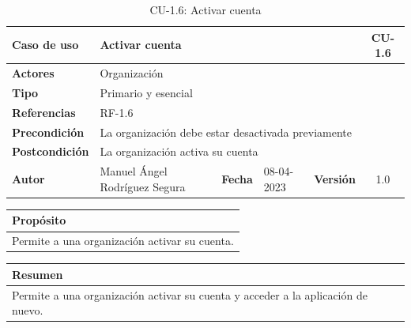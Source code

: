 \begin{table}[H]
    \begin{center}
        \begin{adjustbox}{width=\textwidth}
            \begin{tabular}{ | l | l | l | l | c | c | }
                \hline
                \textbf{Caso de uso} & \multicolumn{4}{l|}{Activar cuenta} & \cellcolor{gray!50} \textbf{CU-1.6}\\
                \hline
                \textbf{Actores} & \multicolumn{5}{p{0.5\linewidth}|}{Organización} \\
                \hline
                \textbf{Tipo} & \multicolumn{5}{l|}{Primario y esencial} \\
                \hline
                \textbf{Referencias} & \multicolumn{3}{l|}{RF-1.6} & \multicolumn{2}{l|}{ }\\
                \hline
                \textbf{Precondición} & \multicolumn{5}{l|}{La organización debe estar desactivada previamente} \\
                \hline
                \textbf{Postcondición} & \multicolumn{5}{l|}{La organización activa su cuenta} \\
                \hline
                \textbf{Autor} & \multicolumn{1}{p{0.25\linewidth}|}{Manuel Ángel Rodríguez Segura} & \textbf{Fecha} &
                08-04-2023     & \textbf{Versión}                                                      & 1.0\\
                \hline
            \end{tabular}
        \end{adjustbox}
        \caption{CU-1.6: Activar cuenta}
        \label{tab:activar-cuenta}
    \end{center}
\end{table}

\begin{table}[H]
    \centering
    \begin{tabularx}{\textwidth}{@{} |L |@{}} \hline
        \textbf{Propósito} \\
        \hline
        Permite a una organización activar su cuenta. \\
        \hline
    \end{tabularx}
\end{table}

\begin{table}[H]
    \centering
    \begin{tabularx}{\textwidth}{@{} |L |@{}} \hline
        \textbf{Resumen} \\
        \hline
        Permite a una organización activar su cuenta y acceder a la aplicación de nuevo. \\
        \hline
    \end{tabularx}
\end{table}

